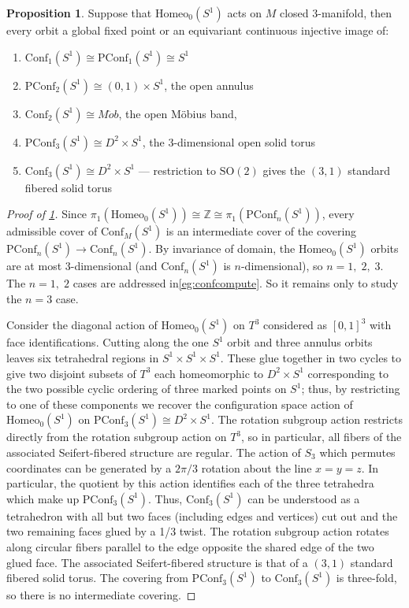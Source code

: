 \documentclass[10pt, oneside]{article}
\newcommand{\Z}{\mathbb{Z}}
\newcommand{\SO}[1][2]{\text{SO}(#1)}
\newcommand{\homeo}[1][S^1]{\text{Homeo}_0(#1)}
\newcommand{\conf}[2][S^1]{\text{Conf}_{#2}(#1)}
\newcommand{\pconf}[2][S^1]{\text{PConf}_{#2}(#1)}
\theoremstyle{definition}
\newtheorem{prop}{Proposition}[section]
\theoremstyle{definition}
\begin{document}
\begin{prop}\label{prop:orbit-computation}
    Suppose that $\homeo$ acts on $M$ closed 3-manifold, then every orbit a global fixed point or an equivariant continuous injective image of:
    \begin{enumerate}
        \item $\conf[S^1]{1} \cong \pconf[S^1]{1}\cong S^1$
        \item $\pconf[S^1]{2} \cong (0,1)\times S^1$, the open annulus
        \item $\conf[S^1]{2} \cong M\ddot{o}b$, the open M\"{o}bius band,
        \item $\pconf[S^1]{3} \cong D^2\times S^1$, the 3-dimensional open solid torus
        \item $\conf[S^1]{3} \cong D^2\times S^1$ --- restriction to $\SO$ gives the $(3, 1)$ standard fibered solid torus
    \end{enumerate}
\end{prop}
\begin{proof}[Proof of \cref{prop:orbit-computation}]
    Since $\pi_1(\homeo) \cong \Z \cong \pi_1(\pconf[S^1]{n})$, every admissible cover of $\conf[S^1]{M}$ is an intermediate cover of the covering $\pconf[S^1]{n}\to \conf[S^1]{n}$. By invariance of domain, the $\homeo$ orbits are at most 3-dimensional (and $\conf[S^1]{n}$ is $n$-dimensional), so $n=1,\; 2,\; 3$. The $n=1,\; 2$ cases are addressed in\cref{eg:confcompute}. So it remains only to study the $n=3$ case. 

     Consider the diagonal action of $\homeo$ on $T^3$ considered as $[0,1]^3$ with face identifications. Cutting along the one $S^1$ orbit and three annulus orbits leaves six tetrahedral regions in $S^1\times S^1\times S^1$. These glue together in two cycles to give two disjoint subsets of $T^3$ each homeomorphic to $D^2 \times S^1$ corresponding to the two possible cyclic ordering of three marked points on $S^1$; thus, by restricting to one of these components we recover the configuration space action of $\homeo$ on $\pconf[S^1]{3}\cong D^2 \times S^1$. The rotation subgroup action restricts directly from the rotation subgroup action on $T^3$, so in particular, all fibers of the associated Seifert-fibered structure are regular. The action of $S_3$ which permutes coordinates can be generated by a $2\pi/3$ rotation about the line $x=y=z$. In particular, the quotient by this action identifies each of the three tetrahedra which make up $\pconf[S^1]{3}$. Thus, $\conf[S^1]{3}$ can be understood as a tetrahedron with all but two faces (including edges and vertices) cut out and the two remaining faces glued by a 1/3 twist. The rotation subgroup action rotates along circular fibers parallel to the edge opposite the shared edge of the two glued face. The associated  Seifert-fibered structure is that of a $(3, 1)$ standard fibered solid torus. The covering from $\pconf[S^1]{3}$ to $\conf[S^1]{3}$ is three-fold, so there is no intermediate covering.
\end{proof}
\end{document}
